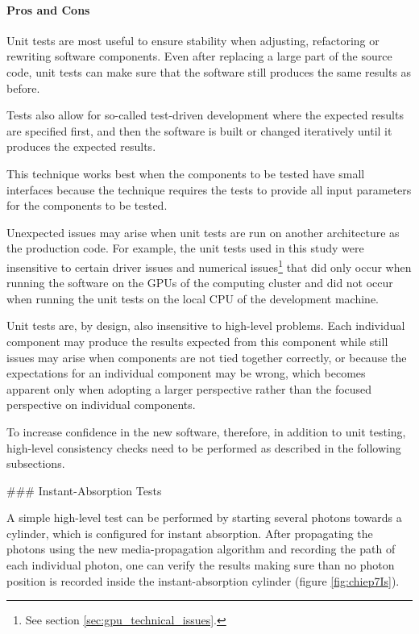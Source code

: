 \paragraph{Pros and Cons}
Unit tests are most useful to ensure stability when adjusting, refactoring or rewriting software components. Even after replacing a large part of the source code, unit tests can make sure that the software still produces the same results as before.

Tests also allow for so-called test-driven development where the expected results are specified first, and then the software is built or changed iteratively until it produces the expected results.

This technique works best when the components to be tested have small interfaces because the technique requires the tests to provide all input parameters for the components to be tested.

Unexpected issues may arise when unit tests are run on another architecture as the production code. For example, the unit tests used in this study were insensitive to certain driver issues and numerical issues\footnote{See section \ref{sec:gpu_technical_issues}.} that did only occur when running the software on the GPUs of the computing cluster and did not occur when running the unit tests on the local CPU of the development machine.

Unit tests are, by design, also insensitive to high-level problems. Each individual component may produce the results expected from this component while still issues may arise when components are not tied together correctly, or because the expectations for an individual component may be wrong, which becomes apparent only when adopting a larger perspective rather than the focused perspective on individual components.

To increase confidence in the new software, therefore, in addition to unit testing, high-level consistency checks need to be performed as described in the following subsections.


### Instant-Absorption Tests
\label{sec:instant_absorption_tests}

A simple high-level test can be performed by starting several photons towards a cylinder, which is configured for instant absorption. After propagating the photons using the new media-propagation algorithm and recording the path of each individual photon, one can verify the results making sure than no photon position is recorded inside the instant-absorption cylinder (figure \ref{fig:chiep7Is}).

